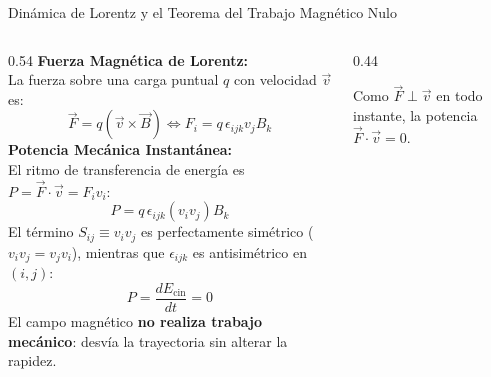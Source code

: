 \documentclass[10pt,aspectratio=169]{beamer}
\begin{document}
\begin{frame}{Dinámica de Lorentz y el Teorema del Trabajo Magnético Nulo}
  \begin{columns}[c]
    \begin{column}{0.54\textwidth}
      \footnotesize
      \textbf{Fuerza Magnética de Lorentz:}\\
      La fuerza sobre una carga puntual $q$ con velocidad $\vec{v}$ es:
      \[
      \vec{F} = q(\vec{v}\times\vec{B}) \iff F_i = q\,\epsilon_{ijk} v_j B_k
      \]
      \textbf{Potencia Mecánica Instantánea:}\\
      El ritmo de transferencia de energía es $P = \vec{F}\cdot\vec{v} = F_i v_i$:
      \[
      P = q\,\epsilon_{ijk} (v_i v_j) B_k
      \]
      El término $S_{ij} \equiv v_i v_j$ es perfectamente simétrico ($v_i v_j = v_j v_i$), mientras que $\epsilon_{ijk}$ es antisimétrico en $(i, j)$:
      \[
      \boxed{P = \frac{dE_{\text{cin}}}{dt} = 0}
      \]
      El campo magnético \textbf{no realiza trabajo mecánico}: desvía la trayectoria sin alterar la rapidez.
    \end{column}
    \begin{column}{0.44\textwidth}
      \centering
      \vspace{0.05cm}

      {\scriptsize Como $\vec{F} \perp \vec{v}$ en todo instante, la potencia $\vec{F}\cdot\vec{v} = 0$.}
    \end{column}
  \end{columns}
\end{frame}
\end{document}
